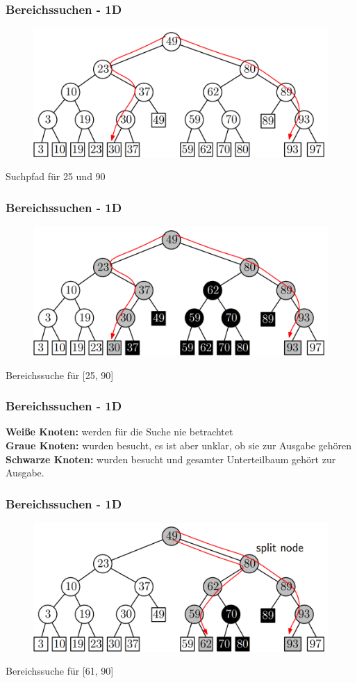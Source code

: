 \begin{frame}
	\frametitle{{Bereichssuchen - 1D}}
\begin{figure}[htbp]
	\begin{center}
  	\includegraphics[width=.8\linewidth]{bilder/1d3}
	\end{center}
\end{figure}
Suchpfad für 25 und 90
\end{frame}

\begin{frame}
	\frametitle{{Bereichssuchen - 1D}}
\begin{figure}[htbp]
	\begin{center}
  	\includegraphics[width=.8\linewidth]{bilder/1d4}
	\end{center}
\end{figure}
Bereichssuche für [25, 90]
\end{frame}

\begin{frame}
	\frametitle{{Bereichssuchen - 1D}}
	\textbf{Weiße Knoten: } werden für die Suche nie betrachtet\\
	\textbf{Graue Knoten: } wurden besucht, es ist aber unklar, ob sie zur Ausgabe gehören\\
	\textbf{Schwarze Knoten: } wurden besucht und gesamter Unterteilbaum gehört zur Ausgabe.
\end{frame}

\begin{frame}
	\frametitle{{Bereichssuchen - 1D}}
\begin{figure}[htbp]
	\begin{center}
  	\includegraphics[width=.8\linewidth]{bilder/1d5}
	\end{center}
\end{figure}
Bereichssuche für [61, 90]
\end{frame}


